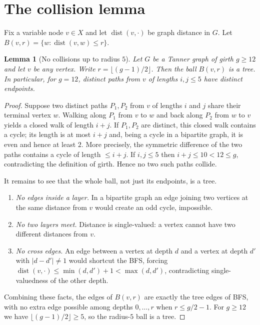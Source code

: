 \documentclass[11pt]{article}
\newtheorem{lemma}[theorem]{Lemma}
\theoremstyle{definition}
\theoremstyle{remark}
\newcommand{\dist}{\operatorname{dist}}
\newcommand{\Ball}{B}
\begin{document}
\section{The collision lemma}

Fix a variable node $v\in X$ and let $\dist(v,\cdot)$ be graph distance in $G$.
Let $\Ball(v,r)=\{w : \dist(v,w)\le r\}$.

\begin{lemma}[No collisions up to radius $5$]\label{lem:collision}
Let $G$ be a Tanner graph of girth $g\ge 12$ and let $v$ be any vertex. Write
$r=\lfloor (g-1)/2\rfloor$. Then the ball $\Ball(v,r)$ is a tree. In
particular, for $g=12$, distinct paths from $v$ of lengths $i,j\le 5$ have
distinct endpoints.
\end{lemma}

\begin{proof}
Suppose two distinct paths $P_1,P_2$ from $v$ of lengths $i$ and $j$ share
their terminal vertex $w$. Walking along $P_1$ from $v$ to $w$ and back along
$P_2$ from $w$ to $v$ yields a closed walk of length $i+j$. If $P_1,P_2$ are
distinct, this closed walk contains a cycle; its length is at most $i+j$ and,
being a cycle in a bipartite graph, it is even and hence at least $2$. More
precisely, the symmetric difference of the two paths contains a cycle of
length $\le i+j$. If $i,j\le 5$ then $i+j\le 10<12\le g$, contradicting the
definition of girth. Hence no two such paths collide.

It remains to see that the whole ball, not just its endpoints, is a tree.
\begin{enumerate}
\item \emph{No edges inside a layer.} In a bipartite graph an edge joining two
vertices at the same distance from $v$ would create an odd cycle, impossible.
\item \emph{No two layers meet.} Distance is single-valued: a vertex cannot
have two different distances from $v$.
\item \emph{No cross edges.} An edge between a vertex at depth $d$ and a
vertex at depth $d'$ with $|d-d'|\neq 1$ would shortcut the BFS, forcing
$\dist(v,\cdot)\le\min(d,d')+1<\max(d,d')$, contradicting single-valuedness of
the other depth.
\end{enumerate}
Combining these facts, the edges of $\Ball(v,r)$ are exactly the tree edges
of BFS, with no extra edge possible among depths $0,\dots,r$ when
$r\le g/2-1$. For $g\ge 12$ we have $\lfloor (g-1)/2\rfloor\ge 5$, so the
radius-$5$ ball is a tree.
\end{proof}
\end{document}
